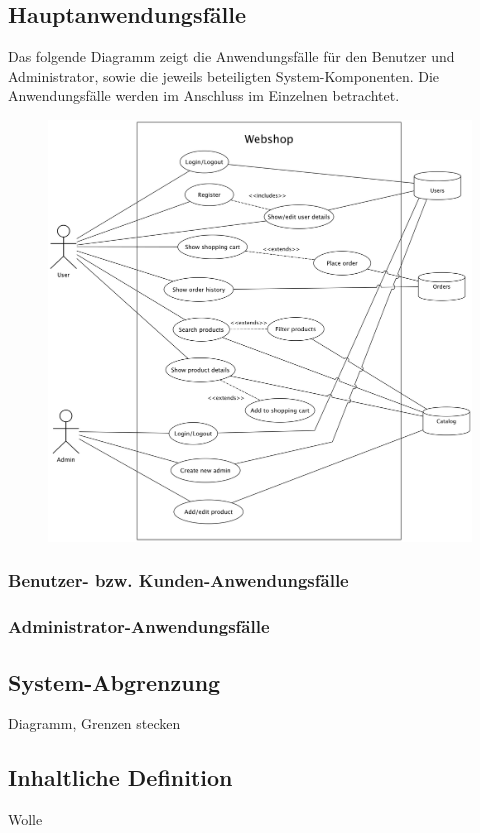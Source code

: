 \subsection{Hauptanwendungsfälle}\label{usecases}
Das folgende Diagramm zeigt die Anwendungsfälle für den Benutzer und Administrator, sowie die jeweils beteiligten System-Komponenten.
Die Anwendungsfälle werden im Anschluss im Einzelnen betrachtet.
\begin{figure}[ht!]
	\centering
	\includegraphics[width=\linewidth]{bilder/kap4/use_cases}
	\caption{}
	\label{fig:usecases}
\end{figure}

\subsubsection{Benutzer- bzw. Kunden-Anwendungsfälle}

\subsubsection{Administrator-Anwendungsfälle}
\subsection{System-Abgrenzung}
Diagramm, Grenzen stecken
\subsection{Inhaltliche Definition}
Wolle